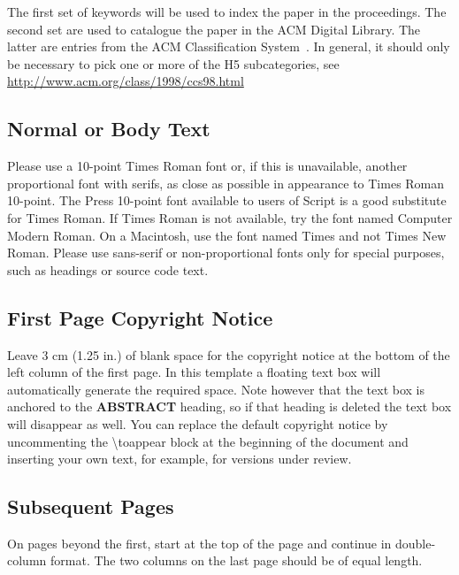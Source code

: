\documentclass{sigchi}
\begin{document}
The first set of keywords will be used to index the paper in the
proceedings. The second set are used to catalogue the paper in the ACM
Digital Library. The latter are entries from the ACM Classification
System~\cite{acm_categories}.  In general, it should only be necessary
to pick one or more of the H5 subcategories, see
\url{http://www.acm.org/class/1998/ccs98.html}

\subsection{Normal or Body Text}

Please use a 10-point Times Roman font or, if this is unavailable,
another proportional font with serifs, as close as possible in
appearance to Times Roman 10-point. The Press 10-point font available
to users of Script is a good substitute for Times Roman. If Times
Roman is not available, try the font named Computer Modern Roman. On a
Macintosh, use the font named Times and not Times New Roman. Please
use sans-serif or non-proportional fonts only for special purposes,
such as headings or source code text.

\subsection{First Page Copyright Notice}

Leave 3 cm (1.25 in.) of blank space for the copyright notice at the
bottom of the left column of the first page. In this template a
floating text box will automatically generate the required space. Note
however that the text box is anchored to the \textbf{ABSTRACT}
heading, so if that heading is deleted the text box will disappear as
well.  You can replace the default copyright notice by uncommenting
the {\textbackslash}toappear block at the beginning of the document
and inserting your own text, for example, for versions under review.


\subsection{Subsequent Pages}

On pages beyond the first, start at the top of the page and continue
in double-column format.  The two columns on the last page should be
of equal length.
\end{document}
